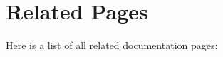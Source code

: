 \section{Related Pages}
Here is a list of all related documentation pages:\begin{CompactList}
\item {}

\end{CompactList}
